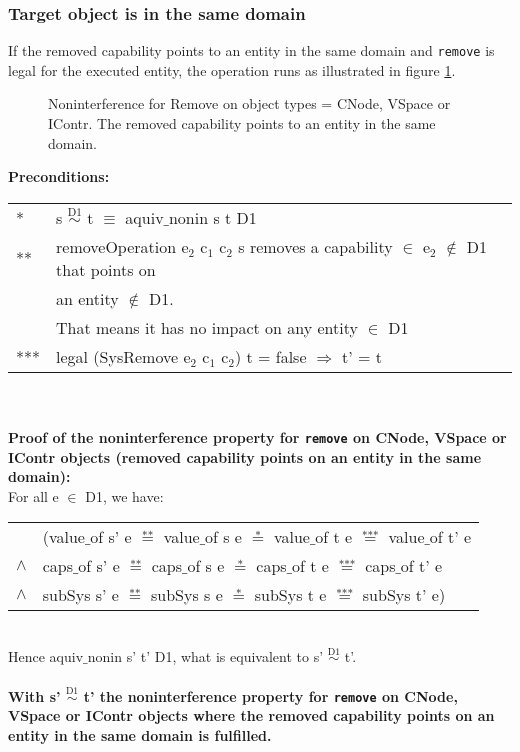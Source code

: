 \subsubsection{Target object is in the same domain} 
If the removed capability points to an entity in the same domain and  \texttt{remove} is legal for the executed entity, the operation runs as illustrated in figure \ref{fig:RemoveCNode}.
\begin{figure}[H]
\caption{Noninterference for Remove on object types = CNode, VSpace or IContr. The removed capability points to an entity in the same domain.}
\label{fig:RemoveCNode}
\end{figure}
\textbf{Preconditions:} \\ 
\begin{tabular}{ll}
* & s $\overset{\text{D1}}{\sim}$ t $\equiv$ aquiv$\_$nonin s t D1	\\ 
** & removeOperation e$_2$ c$_1$ c$_2$ s removes a capability $\in$ e$_2$ $\notin$ D1 that points on \\
& an entity $\notin$ D1. \\
& That means it has no impact on any entity $\in$ D1 \\ 
*** & legal (SysRemove e$_2$ c$_1$ c$_2$) t = false $\Rightarrow$ t' = t
\end{tabular} \\ \\ 
\textbf{Proof of the noninterference property for \texttt{remove} on CNode, VSpace or IContr objects (removed capability points on an entity in the same domain):}\\
For all e $\in$ D1, we have: \\ 
\begin{tabular}{ll}
& (value$\_$of s' e $\overset{\text{**}}{=}$ value$\_$of s e $\overset{\text{*}}{=}$ value$\_$of t e $\overset{\text{***}}{=}$ value$\_$of t' e \\
$\wedge$ & caps$\_$of s' e $\overset{\text{**}}{=}$ caps$\_$of s e $\overset{\text{*}}{=}$ caps$\_$of t e $\overset{\text{***}}{=}$ caps$\_$of t' e \\
$\wedge$ & subSys s' e $\overset{\text{**}}{=}$ subSys s e $\overset{\text{*}}{=}$ subSys t e $\overset{\text{***}}{=}$ subSys t' e)
\end{tabular} \\
Hence aquiv$\_$nonin s' t' D1, what is equivalent to s' $\overset{\text{D1}}{\sim}$ t'. \\ \\ 
\textbf{With s' $\overset{\text{D1}}{\sim}$ t' the noninterference property for \texttt{remove} on CNode, VSpace or IContr objects where the removed capability points on an entity in the same domain is fulfilled.}  
